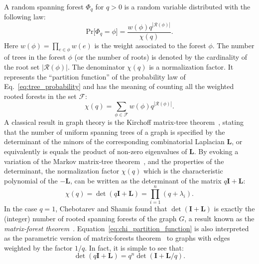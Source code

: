 \documentclass[10pt,aps,pre,twocolumn,nofootinbib,superscriptaddress,longbibliography]{revtex4-1}
\newcommand{\bI}{\mathbf{I}}
\newcommand{\bL}{\mathbf{L}}
\begin{document}
A random spanning forest $\Phi_q$ for $q>0$ is a random variable distributed with the following law:
\begin{equation}\label{eq:tree_probability}
\textrm{Pr}\lbrack \Phi_q=\phi\rbrack = \frac{w(\phi)q^{|\mathcal{R}(\phi)|}} {\chi(q)}.
\end{equation}
Here $w(\phi) = \prod_{e \in \phi} w(e)$ is the weight associated to the forest $\phi$.
The number of trees in the forest $\phi$ (or the number of roots) is denoted by the cardinality of the root set $|\mathcal{R}(\phi)|$.
The denominator $\chi(q)$ is a normalization factor. It represents the ``partition function'' of the probability law of Eq.~\ref{eq:tree_probability} and has the meaning of counting all the weighted rooted forests in the set $\mathcal{F}$:
\begin{equation}
\chi(q) = \sum_{\phi \in \mathcal{F}} w(\phi) q^{|\mathcal{R}(\phi)|}.
\end{equation}
A classical result in graph theory is the Kirchoff matrix-tree theorem~\cite{lyons2017probability,avena2018,avena2018a}, stating that the number of uniform spanning trees of a graph is specified by the determinant of the minors of the corresponding combinatorial Laplacian $\bL$, or equivalently is equals the product of non-zero eigenvalues of $\bL$.
By evoking a variation of the Markov matrix-tree theorem~\cite{avena2018a}, and the properties of the determinant, the normalization factor $\chi(q)$ which is the characteristic polynomial of the $-\bL$, can be written as the determinant of the matrix $q\bI + \bL$:
\begin{equation}\label{eq:chi_partition_function}
\chi(q) = \det(q\bI + \bL) = \prod_{i=1}^{n}(q+\lambda_i).
\end{equation}
In the case $q=1$, Chebotarev and Shamis found that $\det(\bI + \bL)$ is exactly the (integer) number of rooted spanning forests of the graph $G$, a result known as the \emph{matrix-forest theorem}~\cite{chebotarev2006matrix,chebotarev2002forest}.
Equation~\ref{eq:chi_partition_function} is also interpreted as the parametric version of matrix-forests theorem~\cite{agaev2000} to graphs with edges weighted by the factor $1/q$.
In fact, it is simple to see that:
\begin{equation}
\det(q\bI + \bL) = q^n \det(\bI + \bL/q).
\end{equation}
\end{document}
